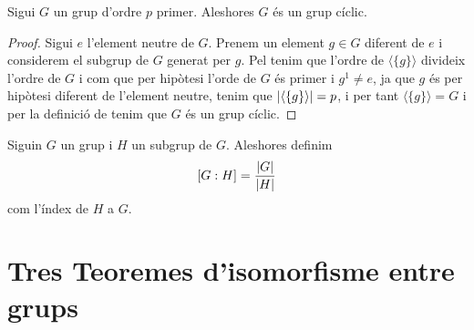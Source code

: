 \documentclass[../Apunts.tex]{subfiles}
\begin{document}
	\begin{corollary} %
		Sigui \(G\) un grup d'ordre \(p\) primer. Aleshores \(G\) és un grup cíclic.
		\begin{proof}
			Sigui \(e\) l'element neutre de \(G\). Prenem un element \(g\in G\) diferent de \(e\) i considerem el subgrup de \(G\) generat per \(g\). Pel  tenim que l'ordre de \(\langle\{g\}\rangle\) divideix l'ordre de \(G\) i com que per hipòtesi l'orde de \(G\) és primer i \(g^{1}\neq e\), ja que \(g\) és per hipòtesi diferent de l'element neutre, tenim que \(\abs{\langle\{g\}\rangle}=p\), i per tant \(\langle\{g\}\rangle=G\) i per la definició de  tenim que \(G\) és un grup cíclic.
		\end{proof}
	\end{corollary}
	\begin{definition}
		\label{def:l'índex d'un subgrup en un grup}
		Siguin \(G\) un grup i \(H\) un subgrup de \(G\). Aleshores definim
		\[[G:H]=\frac{\abs{G}}{\abs{H}}\]
		com l'índex de \(H\) a \(G\).
	\end{definition}
	\section{Tres Teoremes d'isomorfisme entre grups}
\end{document}
